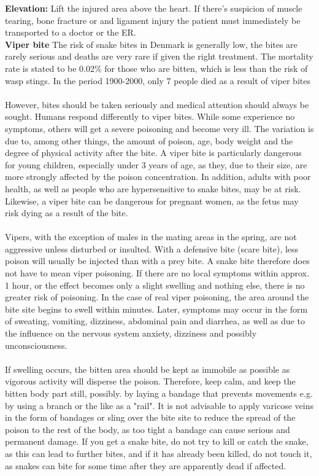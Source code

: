 \documentclass[../../../main.tex]{subfiles}
\begin{document}
\begin{multicols}{2}
\textbf{Elevation:} Lift the injured area above the heart. If there's suspicion of muscle tearing, bone fracture or and ligament injury the patient must immediately be transported to a doctor or the ER.
\\

\textbf{Viper bite}
The risk of snake bites in Denmark is generally low, the bites are rarely serious and deaths are very rare if given the right treatment. The mortality rate is stated to be 0.02\% for those who are bitten, which is less than the risk of wasp stings. In the period 1900-2000, only 7 people died as a result of viper bites \\ \\
However, bites should be taken seriously and medical attention should always be sought. Humans respond differently to viper bites. While some experience no symptoms, others will get a severe poisoning and become very ill. The variation is due to, among other things, the amount of poison, age, body weight and the degree of physical activity after the bite. A viper bite is particularly dangerous for young children, especially under 3 years of age, as they, due to their size, are more strongly affected by the poison concentration. In addition, adults with poor health, as well as people who are hypersensitive to snake bites, may be at risk. Likewise, a viper bite can be dangerous for pregnant women, as the fetus may risk dying as a result of the bite. \\ \\
Vipers, with the exception of males in the mating areas in the spring, are not aggressive unless disturbed or insulted. With a defensive bite (scare bite), less poison will usually be injected than with a prey bite. A snake bite therefore does not have to mean viper poisoning. If there are no local symptoms within approx. 1 hour, or the effect becomes only a slight swelling and nothing else, there is no greater risk of poisoning. In the case of real viper poisoning, the area around the bite site begins to swell within minutes. Later, symptoms may occur in the form of sweating, vomiting, dizziness, abdominal pain and diarrhea, as well as due to the influence on the nervous system anxiety, dizziness and possibly unconsciousness. \\ \\
If swelling occurs, the bitten area should be kept as immobile as possible as vigorous activity will disperse the poison. Therefore, keep calm, and keep the bitten body part still, possibly. by laying a bandage that prevents movements e.g. by using a branch or the like as a "rail". It is not advisable to apply varicose veins in the form of bandages or sling over the bite site to reduce the spread of the poison to the rest of the body, as too tight a bandage can cause serious and permanent damage.
If you get a snake bite, do not try to kill or catch the snake, as this can lead to further bites, and if it has already been killed, do not touch it, as snakes can bite for some time after they are apparently dead if affected.


\end{multicols}
\end{document}
